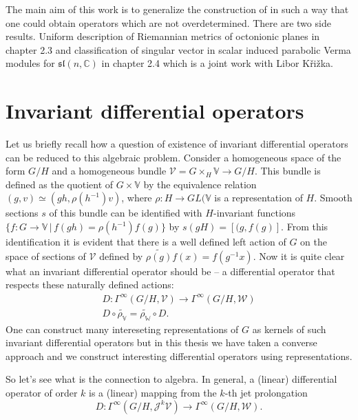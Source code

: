 \documentclass[12pt,a4paper,final]{report}
\begin{document}
The main aim of this work is to generalize the construction of \cite{calderbank_differential_2001} in such a way that one could obtain operators which are not overdetermined. There are two side results. Uniform description of Riemannian metrics of octonionic planes in chapter 2.3 and classification of singular vector in scalar induced parabolic Verma modules for $\mathfrak{sl}(n, \mathbb{C})$ in chapter 2.4 which is a joint work with Libor Křižka.

\chapter{Invariant differential operators}

 Let us briefly recall how a question of existence of invariant differential operators can be reduced to this algebraic problem. Consider a homogeneous space of the form $G/H$ and a homogeneous bundle $\mathcal{V} = G \times_H \mathbb{V} \to G/H$. This bundle is defined as the quotient of $G\times \mathbb{V}$ by the equivalence relation $(g, v) \simeq (gh, \rho(h^{-1}) v)$, where $\rho: H \to GL(\mathbb{V}$ is a representation of $H.$ Smooth sections $s$ of this bundle can be identified with $H$-invariant functions $\{ f \colon G \to \mathbb{V} \,|\, f(gh) = \rho(h^{-1}) f(g)\}$  by $s(gH) = [(g, f(g)].$ From this identification it is evident that there is a well defined left action of $G$ on the space of sections of $\mathcal{V}$ defined by $\widetilde{\rho(g)} f (x) = f(g^{-1}x)$. Now it is quite clear what an invariant differential operator should be -- a differential operator that respects these naturally defined actions:
\begin{gather*}
D \colon \Gamma^\infty(G/H, \mathcal{V}) \to \Gamma^\infty(G/H, \mathcal{W}) \\
D \circ \widetilde{\rho_\mathbb{V}} =  \widetilde{\rho_\mathbb{W}} \circ D.
\end{gather*}
One can construct many intereseting representations of $G$ as kernels of such invariant differential operators but in this thesis we have taken a converse approach and we construct interesting differential operators using representations. 

 So let's see what is the connection to algebra. In general, a (linear) differential operator of order $k$ is a (linear) mapping from the $k$-th jet prolongation 
\[
D\colon \Gamma^\infty(G/H,\mathcal{J}^k \mathcal{V}) \to \Gamma^\infty(G/H, \mathcal{W}).
\]
\end{document}

